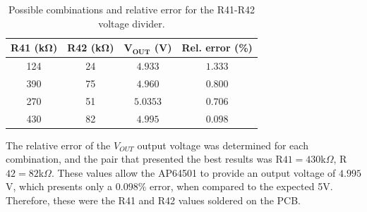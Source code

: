 \begingroup
\begin{table}[H]
	\caption{Possible combinations and relative error for the R41-R42 voltage divider.}
	\label{tab:R41_R42_values}
	\centering%
	\begin{tabular}{cccc}
        \toprule
        \textbf{R41} \textbf{(k}$\mathbf{\Omega}$\textbf{)} & \textbf{R42} \textbf{(k}$\mathbf{\Omega}$\textbf{)} & $\mathbf{V_{OUT}}$ \textbf{(V)} & \textbf{Rel. error (\%)} \\
        \midrule
        124 & 24 & $4.933$ & $1.333$ \\
		\midrule
		390 & 75 & $4.960$ & $0.800$ \\
		\midrule
		270 & 51 & $5.0353$ & $0.706$ \\
		\midrule
		430 & 82 & $4.995$ & $0.098$ \\
        \bottomrule
    \end{tabular}
\end{table}
\endgroup

The relative error of the $V_{OUT}$ output voltage was determined for each combination, and the pair that presented the best results was R$41=430$k$\Omega$, R$42=82$k$\Omega$. These values allow the AP64501 to provide an output voltage of $4.995$V, which presents only a $0.098\%$ error, when compared to the expected 5V. Therefore, these were the R41 and R42 values soldered on the PCB.



